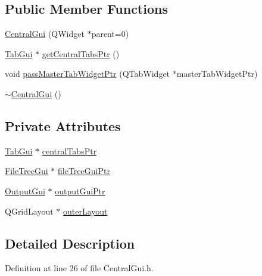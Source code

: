 \subsection*{Public Member Functions}
\begin{DoxyCompactItemize}
\item 
\hyperlink{class_central_gui_aba31873e4b5d4bf9fd1e563601efc4e7}{Central\-Gui} (Q\-Widget $\ast$parent=0)
\item 
\hyperlink{class_tab_gui}{Tab\-Gui} $\ast$ \hyperlink{class_central_gui_a16716c4c66f7ce8e4552fcb20337ab39}{get\-Central\-Tabs\-Ptr} ()
\item 
void \hyperlink{class_central_gui_a8f7149e1e5b7cfc5c694421482c68c5e}{pass\-Master\-Tab\-Widget\-Ptr} (Q\-Tab\-Widget $\ast$master\-Tab\-Widget\-Ptr)
\item 
\hyperlink{class_central_gui_ad54c2077e29d7a2017399b39e62c1043}{$\sim$\-Central\-Gui} ()
\end{DoxyCompactItemize}
\subsection*{Private Attributes}
\begin{DoxyCompactItemize}
\item 
\hyperlink{class_tab_gui}{Tab\-Gui} $\ast$ \hyperlink{class_central_gui_a8ec49e2c3a7c601bed4a7e4ccf173682}{central\-Tabs\-Ptr}
\item 
\hyperlink{class_file_tree_gui}{File\-Tree\-Gui} $\ast$ \hyperlink{class_central_gui_a6abfae93daa17e3af2a814888c9c14cf}{file\-Tree\-Gui\-Ptr}
\item 
\hyperlink{class_output_gui}{Output\-Gui} $\ast$ \hyperlink{class_central_gui_a60c563767906a6db0c209f0b21437a09}{output\-Gui\-Ptr}
\item 
Q\-Grid\-Layout $\ast$ \hyperlink{class_central_gui_ab10e8028968ca8d5bf7b2cfe4b257d52}{outer\-Layout}
\end{DoxyCompactItemize}


\subsection{Detailed Description}


Definition at line 26 of file Central\-Gui.\-h.



